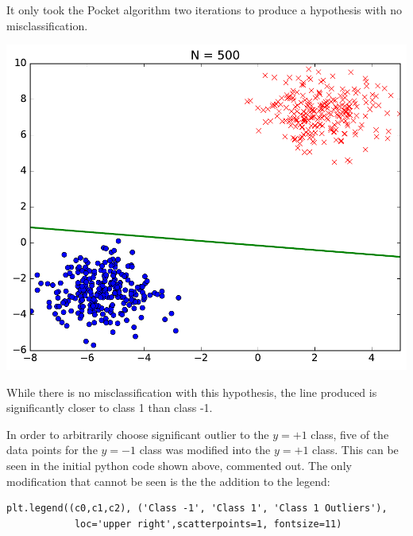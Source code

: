 \documentclass[a4paper]{article}
\begin{document}
\begin {description}
\begin{doublespace}
It only took the Pocket algorithm two iterations to produce a hypothesis with no misclassification.
\begin{center}
\includegraphics[scale=0.5]{No_Outliers/pocket_learning.pdf}
\end{center}
While there is no misclassification with this hypothesis, the line produced is significantly closer to class 1 than class -1.

\newpage
In order to arbitrarily choose significant outlier to the $y = +1$ class, five of the data points for the $y = -1$ class was modified into the $y = +1$ class. This can be seen in the initial python code shown above, commented out. The only modification that cannot be seen is the the addition to the legend:

\begin{lstlisting}[frame=single]
plt.legend((c0,c1,c2), ('Class -1', 'Class 1', 'Class 1 Outliers'), 
   			loc='upper right',scatterpoints=1, fontsize=11)
\end{lstlisting}


\end{doublespace}
\end{description}
\end{document}
